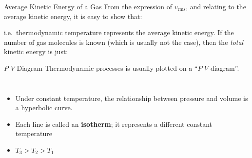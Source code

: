 \documentclass[12pt,aspectratio=169]{beamer}
\begin{document}
\begin{frame}{Average Kinetic Energy of a Gas}
  From the expression of $v_\text{rms}$, and relating to the average kinetic
  energy, it is easy to show that:
  

  i.e.\ thermodynamic temperature represents the average kinetic energy. If the
  number of gas molecules is known (which is usually not the case), then the
  \emph{total} kinetic energy is just:

\end{frame}



\begin{frame}{$P$-$V$ Diagram}
  Thermodynamic processes is usually plotted on a ``$P$-$V$ diagram''.
  \begin{columns}

    \begin{itemize}
    \item Under constant temperature, the relationship between pressure and
      volume is a hyperbolic curve.
    \item Each line is called an \textbf{isotherm}; it represents a different
      constant temperature
    \item $T_3>T_2>T_1$
    \end{itemize}
  \end{columns}
  
\end{frame}
\end{document}
